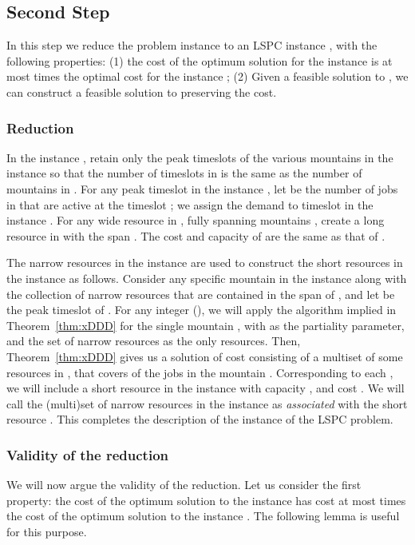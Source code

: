 \documentclass[11pt]{article}
\newcommand{\lspc}{{\sc LSPC}}
\begin{document}
\subsection{Second Step}
In this step we reduce the problem instance  to an {\lspc} instance , with the following properties:
(1) the cost of the optimum solution for the instance  is at most  times the optimal cost for
the instance ; 
(2) Given a feasible solution to , we can construct a feasible solution to  preserving the cost. 

\subsubsection*{Reduction}
In the instance ,  retain only the peak timeslots of the various mountains in the instance 
so that the number of timeslots in  is the same as the number of mountains  in . 
For any  peak timeslot  in the instance , let  be the number of jobs in  that are
active at the timeslot ; we assign the demand  to timeslot  in the instance . 
 For any wide resource  in , fully spanning mountains , 
create a long resource  in  with the span . The cost and capacity of  are
the same as that of . 

The narrow resources in the instance  are used to construct the short resources in the instance  
as follows.
Consider any specific mountain  in the instance  along with the collection of narrow resources  that are 
contained in the span of , and let  be the peak timeslot of . For any integer  (), 
we will apply the algorithm implied in Theorem~\ref{thm:xDDD} for the single mountain , with  as the 
partiality parameter, and the set of narrow resources  as the only resources. 
Then, Theorem~\ref{thm:xDDD} gives us a solution of cost  consisting of a multiset  of some resources in , 
that covers  of the jobs in the mountain . Corresponding to each , we will include a short 
resource  in the instance  with capacity , and cost .  
We will call the (multi)set of narrow resources  in the instance  
as {\em associated} with the short resource .  This completes the description of the instance  
of the {\lspc} problem.

\subsubsection*{Validity of the reduction}
We will now argue the validity of the reduction. 
Let us consider the first property:
the cost of the optimum solution to the instance  has cost at most  times
the cost of the optimum solution to the instance .
The following lemma is useful for this purpose.
\end{document}
